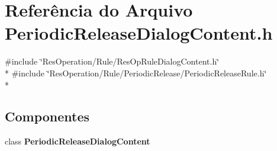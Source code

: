 \section{Referência do Arquivo Periodic\+Release\+Dialog\+Content.\+h}
\label{_rule_2_periodic_release_2_periodic_release_dialog_content_8h}
{\ttfamily \#include \char`\"{}Res\+Operation/\+Rule/\+Res\+Op\+Rule\+Dialog\+Content.\+h\char`\"{}}\\*
{\ttfamily \#include \char`\"{}Res\+Operation/\+Rule/\+Periodic\+Release/\+Periodic\+Release\+Rule.\+h\char`\"{}}\\*
\subsection*{Componentes}
\begin{DoxyCompactItemize}
\item 
class {\bf Periodic\+Release\+Dialog\+Content}
\end{DoxyCompactItemize}
